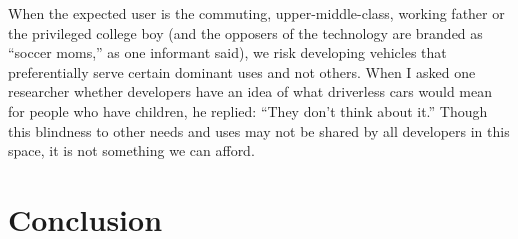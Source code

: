 
When the
expected user is the commuting, upper-middle-class, working father or
the privileged college boy (and the opposers of the technology are
branded as ``soccer moms,'' as one informant said), we risk developing
vehicles that preferentially serve certain dominant uses and not
others. 
When I asked one researcher whether developers have an idea
of what driverless cars would mean for people who have children, he
replied:  ``They don't think about it.'' Though this blindness to
other needs and uses may not be 
shared by all developers in this space, it is not something we can afford.



\section{Conclusion}




